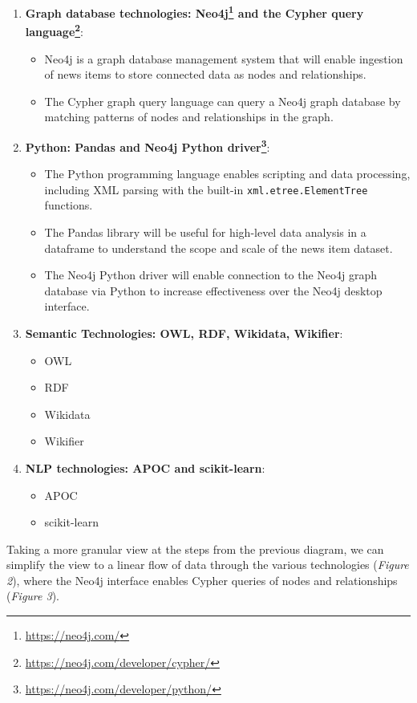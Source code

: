 \documentclass[11pt]{article}
\begin{document}
\begin{enumerate}
  \item \textbf{Graph database technologies: Neo4j\footnote{\url{https://neo4j.com/}} and the Cypher query language\footnote{\url{https://neo4j.com/developer/cypher/}}}:
  \begin{itemize}
    \item Neo4j is a graph database management system that will enable ingestion of news items to store connected data as nodes and relationships.
    \item The Cypher graph query language can query a Neo4j graph database by matching patterns of nodes and relationships in the graph.
  \end{itemize}
  \item \textbf{Python: Pandas and Neo4j Python driver\footnote{\url{https://neo4j.com/developer/python/}}}:
  \begin{itemize}
    \item The Python programming language enables scripting and data processing, including XML parsing with the built-in \verb+xml.etree.ElementTree+ functions.
    \item The Pandas library will be useful for high-level data analysis in a dataframe to understand the scope and scale of the news item dataset.
    \item The Neo4j Python driver will enable connection to the Neo4j graph database via Python to increase effectiveness over the Neo4j desktop interface.
  \end{itemize}
  \item \textbf{Semantic Technologies: OWL, RDF, Wikidata, Wikifier}:
  \begin{itemize}
    \item OWL
    \item RDF
    \item Wikidata
    \item Wikifier
  \end{itemize}
  \item \textbf{NLP technologies: APOC and scikit-learn}:
  \begin{itemize}
    \item APOC
    \item scikit-learn
  \end{itemize}
\end{enumerate}

Taking a more granular view at the steps from the previous diagram, we can simplify the view to a linear flow of data through the various technologies (\textit{Figure 2}), where the Neo4j interface enables Cypher queries of nodes and relationships (\textit{Figure 3}).
\end{document}
